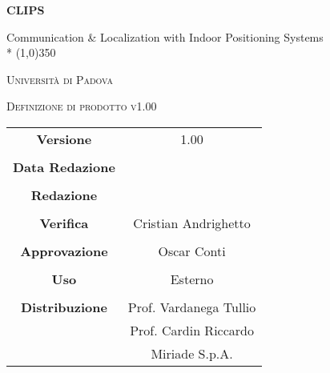 \documentclass[a4paper,12pt]{article}
\author{}
\date{03/03/2016}
\begin{document}
\begin{titlepage}
	\centering
	{\huge\bfseries CLIPS\par}
	Communication \& Localization with Indoor Positioning Systems \\*
	\line(1,0){350} \\
	{\scshape\LARGE Università di Padova \par}
	\vspace{1cm}
	{\scshape\Large Definizione di prodotto v1.00\par}
	\logo
	\newpage
		\begin{tabular}{c|c}
			{\hfill \textbf{Versione}} 			& 1.00				\\ \\
			{\hfill\textbf{Data Redazione}} 	&            		\\ \\
			{\hfill\textbf{Redazione}} 			&  					\\ \\
			{\hfill\textbf{Verifica}} 			& Cristian Andrighetto \\ \\
			{\hfill\textbf{Approvazione}} 		& Oscar Conti		\\ \\
			{\hfill\textbf{Uso}} 				& Esterno			\\ \\
			{\hfill\textbf{Distribuzione}} 		& Prof. Vardanega Tullio \\
												& Prof. Cardin Riccardo \\
												& Miriade S.p.A. \\
		\end{tabular}
	\end{titlepage}
	
	\newpage
	\pagestyle{myfront}
		
	\newpage
		\tableofcontents
	\newpage
		\listoffigures	
	\label{LastFrontPage}
	\newpage
	
	\pagestyle{mymain}
	
	\newpage
		
		
	\newpage
		
		
	\newpage
			
		
	\newpage
		
		
	\newpage
		
		
	\newpage
		
		
		
	\label{LastPage}
\end{document}
